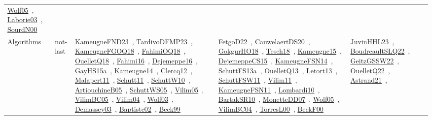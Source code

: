 {\begin{longtable}{lp{3cm}>{\raggedright\arraybackslash}p{6cm}>{\raggedright\arraybackslash}p{6cm}>{\raggedright\arraybackslash}p{8cm}}
\href{../works/Wolf05.pdf}{Wolf05}~\cite{Wolf05}, \href{../works/Laborie03.pdf}{Laborie03}~\cite{Laborie03}, \href{../works/SourdN00.pdf}{SourdN00}~\cite{SourdN00}\\
Algorithms & not-last & \href{../works/KameugneFND23.pdf}{KameugneFND23}~\cite{KameugneFND23}, \href{../works/TardivoDFMP23.pdf}{TardivoDFMP23}~\cite{TardivoDFMP23}, \href{../works/KameugneFGOQ18.pdf}{KameugneFGOQ18}~\cite{KameugneFGOQ18}, \href{../works/FahimiOQ18.pdf}{FahimiOQ18}~\cite{FahimiOQ18}, \href{../works/OuelletQ18.pdf}{OuelletQ18}~\cite{OuelletQ18}, \href{../works/Fahimi16.pdf}{Fahimi16}~\cite{Fahimi16}, \href{../works/Dejemeppe16.pdf}{Dejemeppe16}~\cite{Dejemeppe16}, \href{../works/GayHS15a.pdf}{GayHS15a}~\cite{GayHS15a}, \href{../works/Kameugne14.pdf}{Kameugne14}~\cite{Kameugne14}, \href{../works/Clercq12.pdf}{Clercq12}~\cite{Clercq12}, \href{../works/Malapert11.pdf}{Malapert11}~\cite{Malapert11}, \href{../works/Schutt11.pdf}{Schutt11}~\cite{Schutt11}, \href{../works/SchuttW10.pdf}{SchuttW10}~\cite{SchuttW10}, \href{../works/ArtiouchineB05.pdf}{ArtiouchineB05}~\cite{ArtiouchineB05}, \href{../works/SchuttWS05.pdf}{SchuttWS05}~\cite{SchuttWS05}, \href{../works/Vilim05.pdf}{Vilim05}~\cite{Vilim05}, \href{../works/VilimBC05.pdf}{VilimBC05}~\cite{VilimBC05}, \href{../works/Vilim04.pdf}{Vilim04}~\cite{Vilim04}, \href{../works/Wolf03.pdf}{Wolf03}~\cite{Wolf03}, \href{../works/Demassey03.pdf}{Demassey03}~\cite{Demassey03}, \href{../works/Baptiste02.pdf}{Baptiste02}~\cite{Baptiste02}, \href{../works/Beck99.pdf}{Beck99}~\cite{Beck99} & \href{../works/FetgoD22.pdf}{FetgoD22}~\cite{FetgoD22}, \href{../works/CauwelaertDS20.pdf}{CauwelaertDS20}~\cite{CauwelaertDS20}, \href{../works/GokgurHO18.pdf}{GokgurHO18}~\cite{GokgurHO18}, \href{../works/Tesch18.pdf}{Tesch18}~\cite{Tesch18}, \href{../works/Kameugne15.pdf}{Kameugne15}~\cite{Kameugne15}, \href{../works/DejemeppeCS15.pdf}{DejemeppeCS15}~\cite{DejemeppeCS15}, \href{../works/KameugneFSN14.pdf}{KameugneFSN14}~\cite{KameugneFSN14}, \href{../works/SchuttFS13a.pdf}{SchuttFS13a}~\cite{SchuttFS13a}, \href{../works/OuelletQ13.pdf}{OuelletQ13}~\cite{OuelletQ13}, \href{../works/Letort13.pdf}{Letort13}~\cite{Letort13}, \href{../works/SchuttFSW11.pdf}{SchuttFSW11}~\cite{SchuttFSW11}, \href{../works/Vilim11.pdf}{Vilim11}~\cite{Vilim11}, \href{../works/KameugneFSN11.pdf}{KameugneFSN11}~\cite{KameugneFSN11}, \href{../works/Lombardi10.pdf}{Lombardi10}~\cite{Lombardi10}, \href{../works/BartakSR10.pdf}{BartakSR10}~\cite{BartakSR10}, \href{../works/MonetteDD07.pdf}{MonetteDD07}~\cite{MonetteDD07}, \href{../works/Wolf05.pdf}{Wolf05}~\cite{Wolf05}, \href{../works/VilimBC04.pdf}{VilimBC04}~\cite{VilimBC04}, \href{../works/TorresL00.pdf}{TorresL00}~\cite{TorresL00}, \href{../works/BeckF00.pdf}{BeckF00}~\cite{BeckF00} & \href{../works/JuvinHHL23.pdf}{JuvinHHL23}~\cite{JuvinHHL23}, \href{../works/BoudreaultSLQ22.pdf}{BoudreaultSLQ22}~\cite{BoudreaultSLQ22}, \href{../works/GeitzGSSW22.pdf}{GeitzGSSW22}~\cite{GeitzGSSW22}, \href{../works/OuelletQ22.pdf}{OuelletQ22}~\cite{OuelletQ22}, \href{../works/Astrand21.pdf}{Astrand21}~\cite{Astrand21}, 
\end{longtable}}
